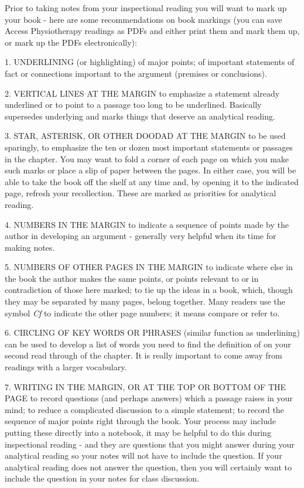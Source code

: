 Prior to taking notes from your inspectional reading you will want to mark up your book - here are some recommendations on book markings (you can save Access Physiotherapy readings as PDFs and either print them and mark them up, or mark up the PDFs electronically):

1. UNDERLINING (or highlighting) of major points; of important statements of fact or connections important to the argument (premises or conclusions).

2. VERTICAL LINES AT THE MARGIN to emphasize a statement already underlined or to point to a passage too long to be underlined. Basically supersedes underlying and marks things that deserve an analytical reading.

3. STAR, ASTERISK, OR OTHER DOODAD AT THE MARGIN to be used sparingly, to emphasize the ten or dozen most important statements or passages in the chapter. You may want to fold a corner of each page on which you make such marks or place a slip of paper between the pages. In either case, you will be able to take the book off the shelf at any time and, by opening it to the indicated page, refresh your recollection. These are marked as priorities for analytical reading.

4. NUMBERS IN THE MARGIN to indicate a sequence of points made by the author in developing an argument - generally very helpful when its time for making notes.

5. NUMBERS OF OTHER PAGES IN THE MARGIN to indicate where else in the book the author makes the same points, or points relevant to or in contradiction of those here marked; to tie up the ideas in a book, which, though they may be separated by many pages, belong together. Many readers use the symbol \textit{Cf} to indicate the other page numbers; it means compare or refer to.

6. CIRCLING OF KEY WORDS OR PHRASES (similar function as underlining) can be used to develop a list of words you need to find the definition of on your second read through of the chapter. It is really important to come away from readings with a larger vocabulary.

7. WRITING IN THE MARGIN, OR AT THE TOP OR BOTTOM OF THE PAGE to record questions (and perhaps answers) which a passage raises in your mind; to reduce a complicated discussion to a simple statement; to record the sequence of major points right through the book. Your process may include putting these directly into a notebook, it may be helpful to do this during inspectional reading - and they are questions that you might answer during your analytical reading so your notes will not have to include the question. If your analytical reading does not answer the question, then you will certainly want to include the question in your notes for class discussion.

